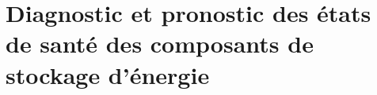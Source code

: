 \chapter{Diagnostic et pronostic des états de santé des composants de stockage d'énergie}
\pagestyle{fancy}
\fancyhead[LE]{\textbf{\thepage}}
\fancyhead[RO]{\textbf{\thepage}}
\fancyhead[LO]{\textbf{\leftmark}}
\renewcommand{\sectionmark}[1]{\markboth{#1}{}}
\fancyfoot{}













\newpage